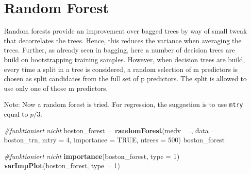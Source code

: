 \documentclass[]{report}
\newenvironment{Shaded}{\begin{snugshade}}{\end{snugshade}}
\newcommand{\KeywordTok}[1]{\textcolor[rgb]{0.13,0.29,0.53}{\textbf{#1}}}
\newcommand{\DataTypeTok}[1]{\textcolor[rgb]{0.13,0.29,0.53}{#1}}
\newcommand{\DecValTok}[1]{\textcolor[rgb]{0.00,0.00,0.81}{#1}}
\newcommand{\StringTok}[1]{\textcolor[rgb]{0.31,0.60,0.02}{#1}}
\newcommand{\CommentTok}[1]{\textcolor[rgb]{0.56,0.35,0.01}{\textit{#1}}}
\newcommand{\OtherTok}[1]{\textcolor[rgb]{0.56,0.35,0.01}{#1}}
\newcommand{\OperatorTok}[1]{\textcolor[rgb]{0.81,0.36,0.00}{\textbf{#1}}}
\newcommand{\NormalTok}[1]{#1}
\begin{document}
\section{Random Forest}\label{random-forest}

Random forests provide an improvement over bagged trees by way of small
tweak that decorrelates the trees. Hence, this reduces the variance when
averaging the trees. Further, as already seen in bagging, here a number
of decision trees are build on bootstrapping training samples. However,
when decision trees are build, every time a split in a tree is
considered, a random selection of m predictors is chosen as split
candidates from the full set of p predictors. The split is allowed to
use only one of those m predictors.

Note: Now a random forest is tried. For regression, the suggestion is to
use \texttt{mtry} equal to \(p/3\).

\begin{Shaded}
\begin{Highlighting}[]
\CommentTok{#funktioniert nicht}
\NormalTok{boston_forest =}\StringTok{ }\KeywordTok{randomForest}\NormalTok{(medv }\OperatorTok{~}\StringTok{ }\NormalTok{., }\DataTypeTok{data =}\NormalTok{ boston_trn, }\DataTypeTok{mtry =} \DecValTok{4}\NormalTok{, }
                             \DataTypeTok{importance =} \OtherTok{TRUE}\NormalTok{, }\DataTypeTok{ntrees =} \DecValTok{500}\NormalTok{)}
\NormalTok{boston_forest}
\end{Highlighting}
\end{Shaded}

\begin{Shaded}
\begin{Highlighting}[]
\CommentTok{#funktioniert nicht}
\KeywordTok{importance}\NormalTok{(boston_forest, }\DataTypeTok{type =} \DecValTok{1}\NormalTok{)}
\KeywordTok{varImpPlot}\NormalTok{(boston_forest, }\DataTypeTok{type =} \DecValTok{1}\NormalTok{)}
\end{Highlighting}
\end{Shaded}

\begin{Shaded}
\end{Shaded}
\end{document}
